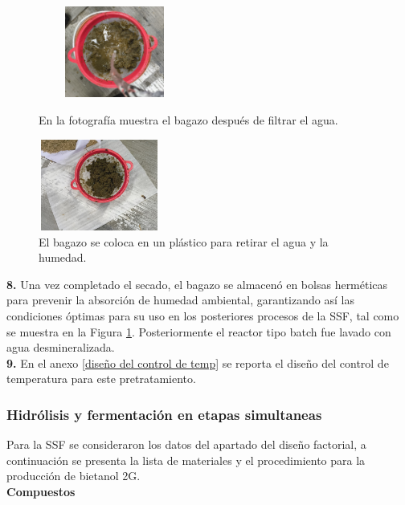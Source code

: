\documentclass[12pt]{article}
\begin{document}
	
		\begin{figure}[H]
		\centering
		\begin{minipage}{0.46\textwidth}
			\centering
			\includegraphics[width=5cm, height=3cm]{imagenes/enjuagado} %
			\caption{En la fotografía muestra el bagazo después de filtrar el agua.}
			\label{enjuagado}
		\end{minipage}
		\hfill
		\begin{minipage}{0.48\textwidth}
			\centering
			\includegraphics[width=4cm, height=3cm]{imagenes/secado6} %
			\caption{El bagazo se coloca en un plástico para retirar el agua y la humedad.}
			\label{biologico4}
		\end{minipage}
	\end{figure}
	
	
	
	
	
	 \textbf{8.} Una vez completado el secado, el bagazo se almacenó en bolsas herméticas para prevenir la absorción de humedad ambiental, garantizando así las condiciones óptimas para su uso en los posteriores procesos de la SSF, tal como se muestra en la Figura \ref{biologico4}. Posteriormente el reactor tipo batch fue lavado con agua desmineralizada. \\[0.5em]
	
	\textbf{9.} En el anexo \ref{diseño del control de temp} se reporta el diseño del control de temperatura para este pretratamiento.
	

			
				\subsubsection{Hidrólisis y fermentación en etapas simultaneas}
				
			Para la SSF se consideraron los datos del apartado del diseño factorial, a continuación se presenta la lista de materiales y el procedimiento para la producción de bietanol 2G.
			\\
					 \textbf{Compuestos} \\[0.5em]
					 
\end{document}
